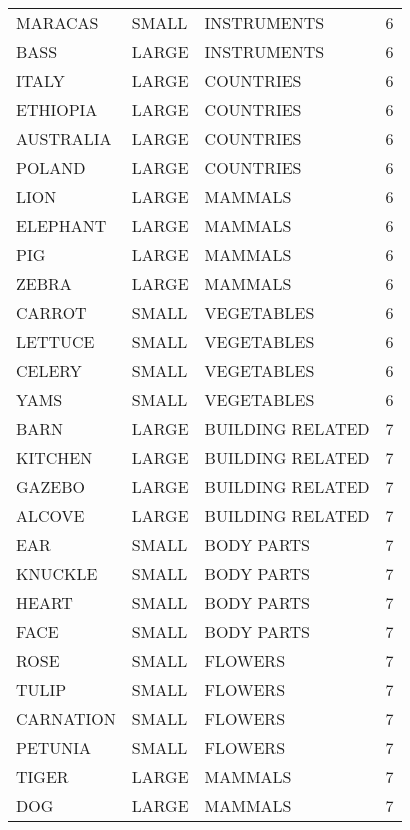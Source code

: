 \begin{tabular}{lllr}
     MARACAS & SMALL &      INSTRUMENTS &        6 \\
        BASS & LARGE &      INSTRUMENTS &        6 \\
       ITALY & LARGE &        COUNTRIES &        6 \\
    ETHIOPIA & LARGE &        COUNTRIES &        6 \\
   AUSTRALIA & LARGE &        COUNTRIES &        6 \\
      POLAND & LARGE &        COUNTRIES &        6 \\
        LION & LARGE &          MAMMALS &        6 \\
    ELEPHANT & LARGE &          MAMMALS &        6 \\
         PIG & LARGE &          MAMMALS &        6 \\
       ZEBRA & LARGE &          MAMMALS &        6 \\
      CARROT & SMALL &       VEGETABLES &        6 \\
     LETTUCE & SMALL &       VEGETABLES &        6 \\
      CELERY & SMALL &       VEGETABLES &        6 \\
        YAMS & SMALL &       VEGETABLES &        6 \\
        BARN & LARGE & BUILDING RELATED &        7 \\
     KITCHEN & LARGE & BUILDING RELATED &        7 \\
      GAZEBO & LARGE & BUILDING RELATED &        7 \\
      ALCOVE & LARGE & BUILDING RELATED &        7 \\
         EAR & SMALL &       BODY PARTS &        7 \\
     KNUCKLE & SMALL &       BODY PARTS &        7 \\
       HEART & SMALL &       BODY PARTS &        7 \\
        FACE & SMALL &       BODY PARTS &        7 \\
        ROSE & SMALL &          FLOWERS &        7 \\
       TULIP & SMALL &          FLOWERS &        7 \\
   CARNATION & SMALL &          FLOWERS &        7 \\
     PETUNIA & SMALL &          FLOWERS &        7 \\
       TIGER & LARGE &          MAMMALS &        7 \\
         DOG & LARGE &          MAMMALS &        7 \\

\end{tabular}

